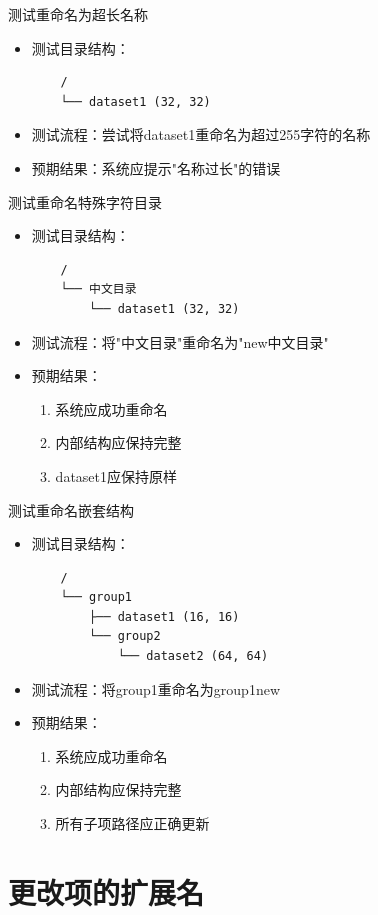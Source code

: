 \documentclass[a4paper,12pt]{report}	%
\begin{document}
测试重命名为超长名称
\begin{itemize}
    \item 测试目录结构：
    \begin{verbatim}
    /
    └── dataset1 (32, 32)
    \end{verbatim}
    \item 测试流程：尝试将dataset1重命名为超过255字符的名称
    \item 预期结果：系统应提示"名称过长"的错误
\end{itemize}

测试重命名特殊字符目录
\begin{itemize}
    \item 测试目录结构：
    \begin{verbatim}
    /
    └── 中文目录
        └── dataset1 (32, 32)
    \end{verbatim}
    \item 测试流程：将"中文目录"重命名为"new中文目录"
    \item 预期结果：
    \begin{enumerate}
        \item 系统应成功重命名
        \item 内部结构应保持完整
        \item dataset1应保持原样
    \end{enumerate}
\end{itemize}

测试重命名嵌套结构
\begin{itemize}
    \item 测试目录结构：
    \begin{verbatim}
    /
    └── group1
        ├── dataset1 (16, 16)
        └── group2
            └── dataset2 (64, 64)
    \end{verbatim}
    \item 测试流程：将group1重命名为group1\textunderscore new
    \item 预期结果：
    \begin{enumerate}
        \item 系统应成功重命名
        \item 内部结构应保持完整
        \item 所有子项路径应正确更新
    \end{enumerate}
\end{itemize}


\section{更改项的扩展名}
\end{document}
